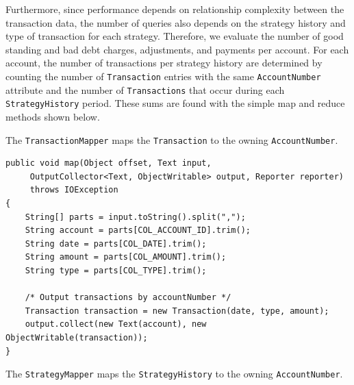 Furthermore, since performance depends on relationship complexity between the transaction data, the number of queries also depends on the strategy history and type of transaction for each strategy. Therefore, we evaluate the number of good standing and bad debt charges, adjustments, and payments per account. For each account, the number of transactions per strategy history are determined by counting the number of {\tt Transaction} entries with the same {\tt AccountNumber} attribute and the number of {\tt Transactions} that occur during each {\tt StrategyHistory} period. These sums are found with the simple map and reduce methods shown below. 

The {\tt TransactionMapper} maps the {\tt Transaction} to the owning {\tt AccountNumber}.
% 
% 
{
\singlespace
\small
\begin{verbatim}
public void map(Object offset, Text input, 
     OutputCollector<Text, ObjectWritable> output, Reporter reporter) 
     throws IOException 
{
    String[] parts = input.toString().split(",");
    String account = parts[COL_ACCOUNT_ID].trim();
    String date = parts[COL_DATE].trim();
    String amount = parts[COL_AMOUNT].trim();
    String type = parts[COL_TYPE].trim();

    /* Output transactions by accountNumber */
    Transaction transaction = new Transaction(date, type, amount);
    output.collect(new Text(account), new ObjectWritable(transaction));
}
\end{verbatim}
}
The {\tt StrategyMapper} maps the {\tt StrategyHistory} to the owning {\tt AccountNumber}.
